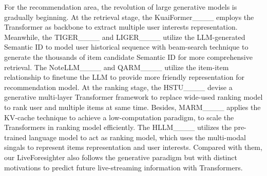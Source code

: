 For the recommendation area, the revolution of large generative models is gradually beginning.
%
At the retrieval stage, the KuaiFormer____ employs the Transformer as backbone to extract multiple user interests representation.
%
Meanwhile, the TIGER____ and LIGER____ utilize the LLM-generated Semantic ID to model user historical sequence with beam-search technique to generate the thousands of item candidate Semantic ID for more comprehensive retrieval.
%
The NoteLLM____ and QARM____ utilize the item-item relationship to finetune the LLM to provide more friendly representation for recommendation model.
%
At the ranking stage, the HSTU____ devise a generative multi-layer Transformer framework to replace wide-used ranking model to rank user and multiple items at same time.
%
Besides, MARM____ applies the KV-cache technique to achieve a low-computation paradigm, to scale the Transformers in ranking model efficiently.
%
The HLLM____ utilizes the pre-trained language model to act as ranking model, which uses the multi-modal singals to represent items representation and user interests.
%
Compared with them, our LiveForesighter also follows the generative paradigm but with distinct motivations to predict future live-streaming information with Transformers.
%